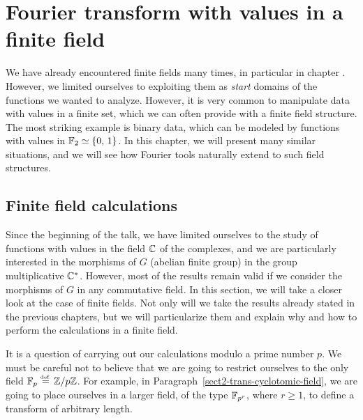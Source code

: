  
 
\chapter{Fourier transform with values in a finite field}
\label{chap-extension-finite-field-values}
 
 
We have already encountered finite fields many times, in particular in chapter . However, we limited ourselves to exploiting them as \textit{start} domains of the functions we wanted to analyze. However, it is very common to manipulate data with values in a finite set, which we can often provide with a finite field structure. The most striking example is binary data, which can be modeled by functions with values in $ \mathbb{F}_2 \simeq \{0, \, 1\} $. In this chapter, we will present many similar situations, and we will see how Fourier tools naturally extend to such field structures.
 
\section{Finite field calculations}
\label{sect1-calculations-finite-field}
 
 
Since the beginning of the talk, we have limited ourselves to the study of functions with values in the field $ \mathbb{C} $ of the complexes, and we are particularly interested in the morphisms of $ G $ (abelian finite group) in the group multiplicative $ \mathbb{C}^* $. However, most of the results remain valid if we consider the morphisms of $ G $ in any commutative field. In this section, we will take a closer look at the case of finite fields. Not only will we take the results already stated in the previous chapters, but we will particularize them and explain why and how to perform the calculations in a finite field.
 
 
It is a question of carrying out our calculations modulo a prime number $ p $. We must be careful not to believe that we are going to restrict ourselves to the only field $ \mathbb{F}_p \stackrel{\mbox{\upshape\tiny def.}}{=} \mathbb{Z}/p \mathbb{Z} $. For example, in Paragraph~\ref{sect2-trans-cyclotomic-field}, we are going to place ourselves in a larger field, of the type $ \mathbb{F}_{p^r} $, where $ r \geq 1 $, to define a transform of arbitrary length.
